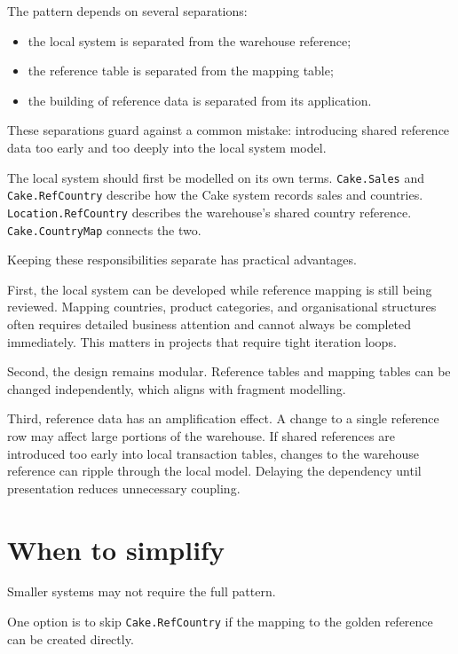 \documentclass[10pt,openany,10pt]{book}
\providecommand{\tightlist}{%
  \setlength{\itemsep}{0pt}\setlength{\parskip}{0pt}}
\begin{document}
The pattern depends on several separations:

\begin{itemize}
\tightlist
\item
  the local system is separated from the warehouse reference;
\item
  the reference table is separated from the mapping table;
\item
  the building of reference data is separated from its application.
\end{itemize}

These separations guard against a common mistake: introducing shared
reference data too early and too deeply into the local system model.

The local system should first be modelled on its own terms.
\texttt{Cake.Sales} and \texttt{Cake.RefCountry} describe how the Cake
system records sales and countries. \texttt{Location.RefCountry}
describes the warehouse's shared country reference.
\texttt{Cake.CountryMap} connects the two.

Keeping these responsibilities separate has practical advantages.

First, the local system can be developed while reference mapping is
still being reviewed. Mapping countries, product categories, and
organisational structures often requires detailed business attention and
cannot always be completed immediately. This matters in projects that
require tight iteration loops.

Second, the design remains modular. Reference tables and mapping tables
can be changed independently, which aligns with fragment modelling.

Third, reference data has an amplification effect. A change to a single
reference row may affect large portions of the warehouse. If shared
references are introduced too early into local transaction tables,
changes to the warehouse reference can ripple through the local model.
Delaying the dependency until presentation reduces unnecessary coupling.

\section{When to simplify}\label{when-to-simplify}

Smaller systems may not require the full pattern.

One option is to skip \texttt{Cake.RefCountry} if the mapping to the
golden reference can be created directly.
\end{document}
